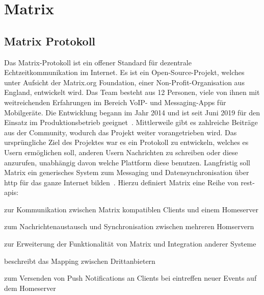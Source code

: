     \newpage
    \section{Matrix}\label{sec:matrix}

    \subsection{Matrix Protokoll}\label{subsec:matrix-protokoll}
    Das Matrix-Protokoll ist ein offener Standard für dezentrale Echtzeitkommunikation im Internet.
    Es ist ein Open-Source-Projekt, welches unter Aufsicht der Matrix.org Foundation, einer Non-Profit-Organisation aus England, entwickelt wird.
    Das Team besteht aus 12 Personen, viele von ihnen mit weitreichenden Erfahrungen im Bereich VoIP- und Messaging-Apps für Mobilgeräte.
    Die Entwicklung begann im Jahr 2014 und ist seit Juni 2019 für den Einsatz im Produktionsbetrieb geeignet~\cite{matrixfaq}.
    Mittlerweile gibt es zahlreiche Beiträge aus der Community, wodurch das Projekt weiter vorangetrieben wird.
    Das ursprüngliche Ziel des Projektes war es ein Protokoll zu entwickeln, welches es Usern ermöglichen soll, anderen Usern Nachrichten zu schreiben oder diese anzurufen, unabhängig davon welche Plattform diese benutzen.
    Langfristig soll Matrix ein generisches System zum Messaging und Datensynchronisation über \acs{http} für das ganze Internet bilden~\cite{matrixfaq}.
    Hierzu definiert Matrix eine Reihe von \acs{rest}-\acsp{api}:
    \begin{description}[leftmargin=!,labelwidth=5.5cm]
        \item [Client-Server-API\footnotemark]  zur Kommunikation zwischen Matrix kompatiblen Clients und einem Homeserver
        \item [Server-Server-API\footnotemark]  zum Nachrichtenaustausch und Synchronisation zwischen mehreren Homservern
        \item [Application-Service-API\footnotemark]  zur Erweiterung der Funktionalität von Matrix und Integration anderer Systeme
        \item [Identity-Service-API\footnotemark]  beschreibt das Mapping zwischen Drittanbietern
        \item [Push-Gateway-API\footnotemark]  zum Versenden von Push Notifications an Clients bei eintreffen neuer Events auf dem Homeserver
    \end{description}

